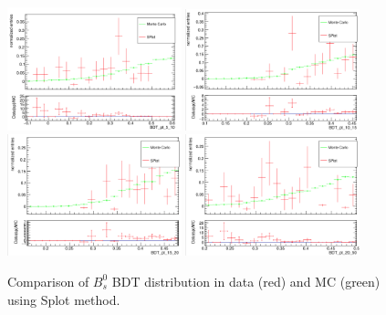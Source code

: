 \begin{figure}[h]
\begin{center}
\includegraphics[width=0.45\textwidth]{Figures/Chapter5/Bs_BDT_5_10.png}
\includegraphics[width=0.45\textwidth]{Figures/Chapter5/Bs_BDT_10_15.png}
\includegraphics[width=0.45\textwidth]{Figures/Chapter5/Bs_BDT_15_20.png}
\includegraphics[width=0.45\textwidth]{Figures/Chapter5/Bs_BDT_20_50.png}
\caption{Comparison of $B^0_s$ BDT distribution in data (red) and MC (green) using Splot method.}
\label{BsMCData}
\end{center}
\end{figure}


